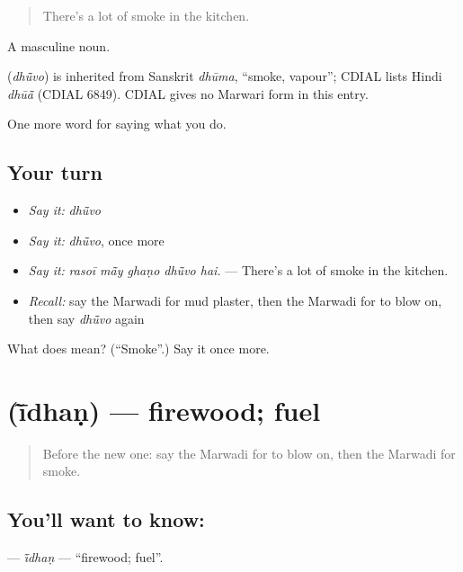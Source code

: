 \begin{quote}
There's a lot of smoke in the kitchen.
\end{quote}

A masculine noun.

\begin{cousinweb}
\textbf{} (\emph{dhū̃vo}) is inherited from Sanskrit \emph{dhūma}, \textquotedblleft{}smoke, vapour\textquotedblright{}; CDIAL lists Hindi \emph{dhūā̃} (CDIAL 6849). CDIAL gives no Marwari form in this entry.
\end{cousinweb}

\begin{grammarlens}[title={What you've built}]
One more word for saying what you do.
\end{grammarlens}

\subsection*{Your turn}
\begin{itemize}
\raggedright
  \item \emph{Say it:} \emph{dhū̃vo}
  \item \emph{Say it:} \emph{dhū̃vo}, once more
  \item \emph{Say it:} \emph{rasoī mā̃y ghaṇo dhū̃vo hai.} — There's a lot of smoke in the kitchen.
  \item \emph{Recall:} say the Marwadi for mud plaster, then the Marwadi for to blow on, then say \emph{dhū̃vo} again
\end{itemize}

\begin{tcolorbox}[breakable,colback=teal!4,colframe=teal!35!black,title={Before you move on}]
What does  mean? (\textquotedblleft{}Smoke\textquotedblright{}.) Say it once more.
\end{tcolorbox}
\section[\texorpdfstring{\mw{ईंधण} (ī̃dhaṇ)}{ईंधण (ī̃dhaṇ)}]{ (ī̃dhaṇ) — firewood; fuel}

\label{lesson:MW-C173-idhan}



\begin{quote}
Before the new one: say the Marwadi for to blow on, then the Marwadi for smoke.
\end{quote}

\subsection*{You'll want to know: }
\textbf{} — \emph{ī̃dhaṇ} — \textquotedblleft{}firewood; fuel\textquotedblright{}.

